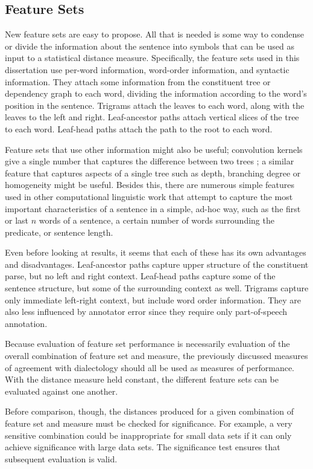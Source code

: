 \subsection{Feature Sets}

New feature sets are easy to propose. All that is needed is some way to
condense or divide the information about the sentence into symbols
that can be used as input to a statistical distance
measure. Specifically, the feature sets used in this dissertation use
per-word information, word-order information, and syntactic
information. They attach some information from the constituent tree or
dependency graph to each word, dividing the information according to
the word's position in the sentence. Trigrams attach the leaves to
each word, along with the leaves to the left and right.
Leaf-ancestor paths attach vertical slices of the tree to each
word. Leaf-head paths attach the path to the root to each word.

Feature sets that use other information might also be useful;
convolution kernels give a single number that captures the difference
between two trees \cite{collins01}; a similar feature that captures
aspects of a single tree such as depth, branching degree or
homogeneity might be useful. Besides this, there are numerous simple
features used in other computational linguistic work that attempt to
capture the most important characteristics of a sentence in a simple,
ad-hoc way, such as the first or last $n$ words of a sentence, a
certain number of words surrounding the predicate, or sentence length.

Even before looking at results, it seems that each of these has its
own advantages and disadvantages. Leaf-ancestor paths capture upper
structure of the constituent parse, but no left and right
context. Leaf-head paths capture some of the sentence structure, but
some of the surrounding context as well. Trigrams capture only
immediate left-right context, but include word order information. They
are also less influenced by annotator error since they require only
part-of-speech annotation.

Because evaluation of feature set performance is necessarily evaluation
of the overall combination of feature set and measure, the previously
discussed measures of agreement with dialectology should all be used
as measures of performance. With the distance measure held constant,
the different feature sets can be evaluated against one another.

Before comparison, though, the distances produced for a given
combination of feature set and measure must be checked for
significance. For example, a very sensitive combination could be
inappropriate for small data sets if it can only achieve significance
with large data sets. The significance test ensures that subsequent
evaluation is valid.

